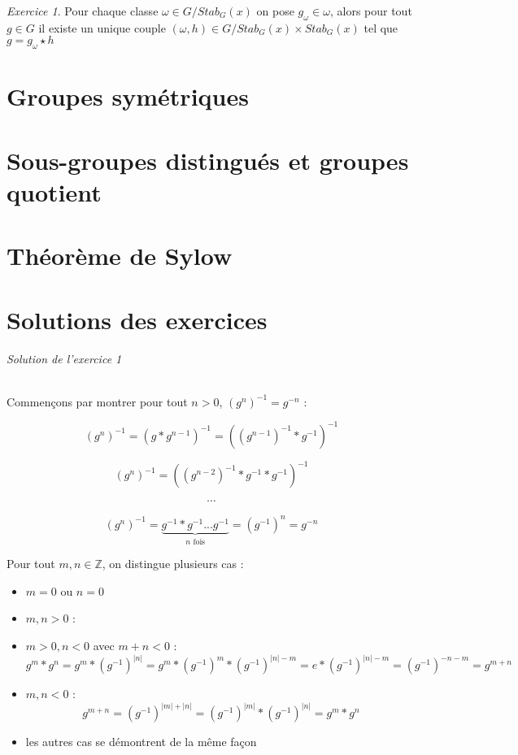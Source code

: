 \documentclass[]{article}
\theoremstyle{remark}
\newtheorem{myexer}{Exercice}
\theoremstyle{definition}
\begin{document}
\begin{myexer}
	Pour chaque classe $\omega \in G/Stab_G(x)$ on pose $g_\omega \in \omega$, alors pour tout $g \in G$ il existe un unique couple $(\omega, h) \in G/Stab_G(x) \times Stab_G(x)$ tel que $g = g_\omega \star h$
\end{myexer}


\part{Groupes symétriques}
\part{Sous-groupes distingués et groupes quotient}
\part{Théorème de Sylow}

\part{Solutions des exercices}

\paragraph{Solution de l'exercice 1}

Commençons par montrer pour tout $n > 0$, $( g^n )^{-1} = g^{-n}$ :

$$\left( g^n \right)^{-1} = (g * g^{n-1})^{-1} = ((g^{n-1})^{-1}*g^{-1})^{-1}$$

$$\left( g^n \right)^{-1} = ((g^{n-2})^{-1}*g^{-1}*g^{-1})^{-1}$$

$$\cdots$$

$$\left( g^n \right)^{-1} = \underbrace{g^{-1}*g^{-1} ... g^{-1}}_{n \text{ fois}} = (g^{-1})^n = g^{-n}$$

Pour tout $m, n \in \mathbb{Z}$, on distingue plusieurs cas :
\begin{itemize}
	\item $m = 0$ ou $n = 0$ \checkmark
	\item $m, n > 0$ : \checkmark
	\item $m > 0, n < 0$ avec $m + n < 0$ : $$g^m * g^n = g^m * \left(g^{-1}\right)^{|n|} = g^m*\left(g^{-1}\right)^m*\left(g^{-1}\right)^{|n| - m} = e * \left(g^{-1}\right)^{|n|-m}=\left(g^{-1}\right)^{-n-m}=g^{m+n}$$
	\item $m, n < 0$ : $$g^{m+n}=\left(g^{-1}\right)^{|m|+|n|}=\left(g^{-1}\right)^{|m|}*\left(g^{-1}\right)^{|n|}=g^m*g^n$$
	\item les autres cas se démontrent de la même façon
\end{itemize}
\end{document}
